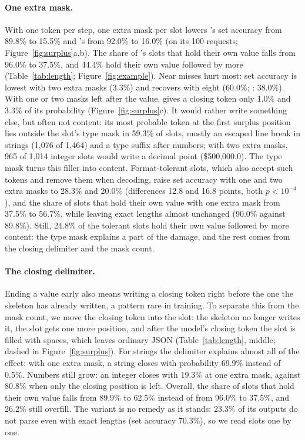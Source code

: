 \paragraph{One extra mask.} With one token per step, one extra mask per slot lowers \dream's set accuracy from 89.8\% to 15.5\% and \llada's from 92.0\% to 16.0\% (on its 100 requests; Figure~\ref{fig:surplus}a,b). The share of \dream's slots that hold their own value falls from 96.0\% to 37.5\%, and 44.4\% hold their own value followed by more (Table~\ref{tab:length}; Figure~\ref{fig:example}). Near misses hurt most: set accuracy is lowest with two extra masks (3.3\%) and recovers with eight (60.0\%; \llada: 38.0\%). With one or two masks left after the value, \dream gives a closing token only 1.0\% and 3.3\% of its probability (Figure~\ref{fig:surplus}c). It would rather write something else, but often not content: its most probable token at the first surplus position lies outside the slot's type mask in 59.3\% of slots, mostly an escaped line break in strings (1,076 of 1,464) and a type suffix after numbers; with two extra masks, 965 of 1,014 integer slots would write a decimal point (\$500{,}000.0). The type mask turns this filler into content. Format-tolerant slots, which also accept such tokens and remove them when decoding, raise set accuracy with one and two extra masks to 28.3\% and 20.0\% (differences 12.8 and 16.8 points, both $p<10^{-4}$), and the share of slots that hold their own value with one extra mask from 37.5\% to 56.7\%, while leaving exact lengths almost unchanged (90.0\% against 89.8\%). Still, 24.8\% of the tolerant slots hold their own value followed by more content: the type mask explains a part of the damage, and the rest comes from the closing delimiter and the mask count.

\paragraph{The closing delimiter.} Ending a value early also means writing a closing token right before the one the skeleton has already written, a pattern rare in training. To separate this from the mask count, we move the closing token into the slot: the skeleton no longer writes it, the slot gets one more position, and after the model's closing token the slot is filled with spaces, which leaves ordinary JSON (Table~\ref{tab:length}, middle; dashed in Figure~\ref{fig:surplus}). For strings the delimiter explains almost all of the effect: with one extra mask, a string closes with probability 69.9\% instead of 0.5\%. Numbers still grow: an integer closes with 19.3\% at one extra mask, against 80.8\% when only the closing position is left. Overall, the share of slots that hold their own value falls from 89.9\% to 62.5\% instead of from 96.0\% to 37.5\%, and 26.2\% still overfill. The variant is no remedy as it stands: 23.3\% of its outputs do not parse even with exact lengths (set accuracy 70.3\%), so we read slots one by one.

